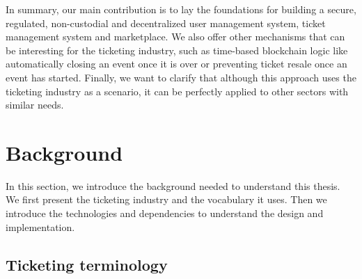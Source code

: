 \documentclass[a4paper,11pt,oneside]{report}
\begin{document}
In summary, our main contribution is to lay the foundations for building a secure, regulated, non-custodial and decentralized user management system, ticket management system and marketplace. We also offer other mechanisms that can be interesting for the ticketing industry, such as time-based blockchain logic like automatically closing an event once it is over or preventing ticket resale once an event has started. Finally, we want to clarify that although this approach uses the ticketing industry as a scenario, it can be perfectly applied to other sectors with similar needs.

\chapter{Background}
In this section, we introduce the background needed to understand this thesis. We first present the ticketing industry and the vocabulary it uses. Then we introduce the technologies and dependencies to understand the design and implementation.

\section{Ticketing terminology}
\label{sec:ticketing_terminology}
\end{document}

